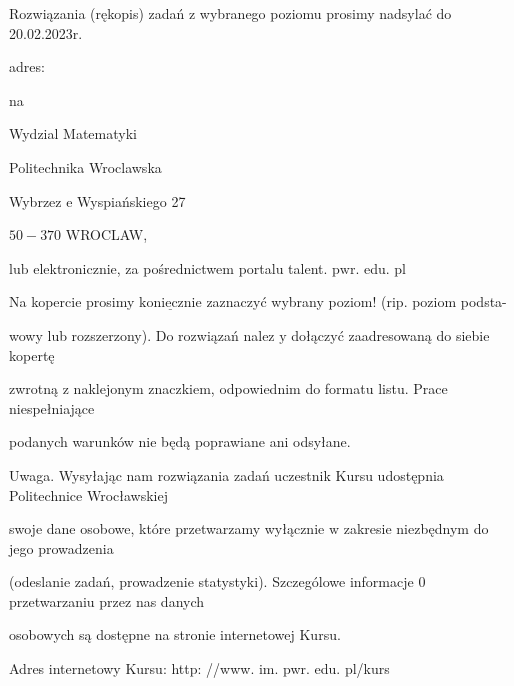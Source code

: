 \documentclass[a4paper,12pt]{article}
\begin{document}
Rozwiązania (rękopis) zadań z wybranego poziomu prosimy nadsylać do 20.02.2023r.

adres:

na

Wydzial Matematyki

Politechnika Wroclawska

Wybrzez $\mathrm{e}$ Wyspiańskiego 27

$50-370$ WROCLAW,

$\mathrm{l}\mathrm{u}\mathrm{b}$ elektronicznie, za pośrednictwem portalu talent. $\mathrm{p}\mathrm{w}\mathrm{r}$. edu. pl

Na kopercie prosimy $\underline{\mathrm{k}\mathrm{o}\mathrm{n}\mathrm{i}\mathrm{e}\mathrm{c}\mathrm{z}\mathrm{n}\mathrm{i}\mathrm{e}}$ zaznaczyć wybrany poziom! (rip. poziom podsta-

wowy lub rozszerzony). Do rozwiązań nalez $\mathrm{y}$ dołączyć zaadresowaną do siebie kopertę

zwrotną $\mathrm{z}$ naklejonym znaczkiem, odpowiednim do formatu listu. Prace niespełniające

podanych warunków nie będą poprawiane ani odsyłane.

Uwaga. Wysyłając nam rozwiązania zadań uczestnik Kursu udostępnia Politechnice Wrocławskiej

swoje dane osobowe, które przetwarzamy wyłącznie $\mathrm{w}$ zakresie niezbędnym do jego prowadzenia

(odeslanie zadań, prowadzenie statystyki). Szczególowe informacje $0$ przetwarzaniu przez nas danych

osobowych są dostępne na stronie internetowej Kursu.

Adres internetowy Kursu: http: //www. im. pwr. edu. pl/kurs
\end{document}
